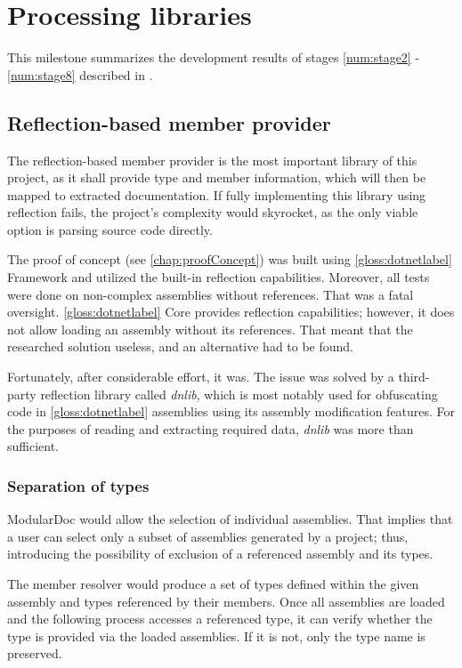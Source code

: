 \chapter{Processing libraries} \label{chap:processingLibraries}

This milestone summarizes the development results of stages \ref{num:stage2} - \ref{num:stage8} described in .

\section{Reflection-based member provider}

The reflection-based member provider is the most important library of this project, as it shall provide type and member information, which will then be mapped to extracted documentation. If fully implementing this library using reflection fails, the project's complexity would skyrocket, as the only viable option is parsing source code directly.

The proof of concept (see \ref{chap:proofConcept}) was built using \ref{gloss:dotnetlabel} Framework and utilized the built-in reflection capabilities. Moreover, all tests were done on non-complex assemblies without references. That was a fatal oversight. \ref{gloss:dotnetlabel} Core provides reflection capabilities; however, it does not allow loading an assembly without its references. That meant that the researched solution useless, and an alternative had to be found.

Fortunately, after considerable effort, it was. The issue was solved by a third-party reflection library called \textit{dnlib}, which is most notably used for obfuscating code in \ref{gloss:dotnetlabel} assemblies using its assembly modification features. For the purposes of reading and extracting required data, \textit{dnlib} was more than sufficient.

\subsection{Separation of types}

ModularDoc would allow the selection of individual assemblies. That implies that a user can select only a subset of assemblies generated by a project; thus, introducing the possibility of exclusion of a referenced assembly and its types.

The member resolver would produce a set of types defined within the given assembly and types referenced by their members. Once all assemblies are loaded and the following process accesses a referenced type, it can verify whether the type is provided via the loaded assemblies. If it is not, only the type name is preserved.

